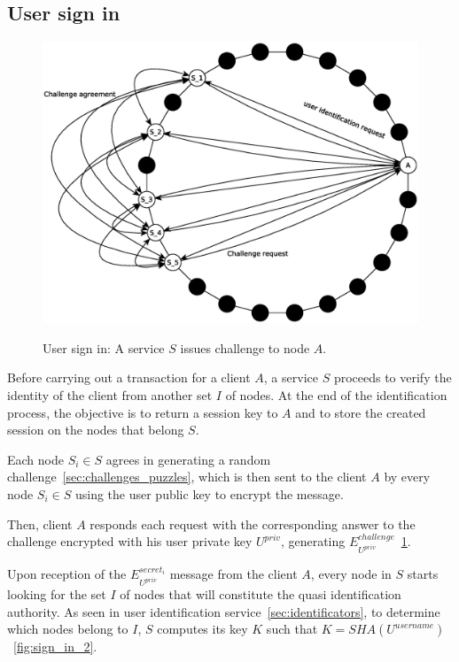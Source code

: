 \subsection{User sign in}
\begin{figure}[!htb]
\centering
\includegraphics[width=14cm]{../img/sign_in}\\
\caption{User sign in: A service $S$ issues challenge to node $A$.}
\label{fig:sign_in}
\end{figure}

Before carrying out a transaction for a client $A$, a service $S$ proceeds to
verify the identity of the client from another set $I$ of nodes. At the end of
the identification process, the objective is to return a session key to $A$
and to store the created session on the nodes that belong $S$.

Each node $S_i \in S$ agrees in generating a random challenge~\ref{sec:challenges_puzzles}, which is then sent to the
client $A$ by every node $S_i \in S$ using the user public key to encrypt the
message.

Then, client $A$ responds each request with the corresponding answer to the
challenge encrypted with his user private key $U^{priv}$, generating
$E^{challenge}_{U^{priv}}$~\ref{fig:sign_in}. 

Upon reception of the $E^{secret_i}_{U^{priv}}$ message from the client $A$, every node in $S$
starts looking for the set $I$ of nodes that will constitute the quasi
identification authority. As seen in user identification service~\ref{sec:identificators}, to
determine which nodes belong to $I$, $S$ computes
its key $K$ such that $K = SHA(U^{username})$~\ref{fig:sign_in_2}.

